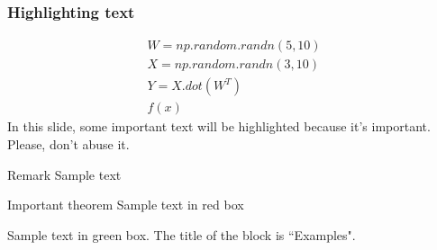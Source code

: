 \documentclass{beamer}
\begin{document}
\begin{frame}
\frametitle{Highlighting text}

\begin{gather}
	W = np.random.randn(5, 10) \\
	X = np.random.randn(3, 10) \\
	Y = X.dot(W^{T}) \\
	f(x)
\end{gather}
%
In this slide, some important text will be
\alert{highlighted} because it's important.
Please, don't abuse it.

\begin{block}{Remark}
Sample text
\end{block}

\begin{alertblock}{Important theorem}
Sample text in red box
\end{alertblock}

\begin{examples}
Sample text in green box. The title of the block is ``Examples".
\end{examples}
\end{frame}
\end{document}
